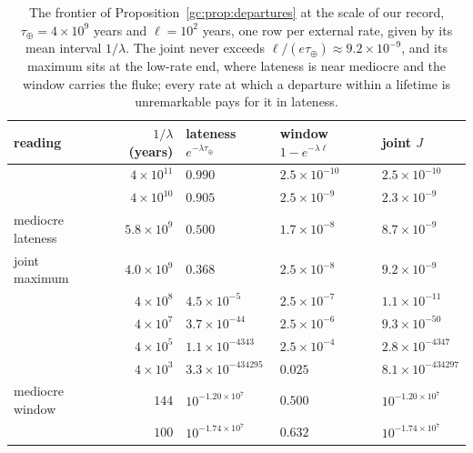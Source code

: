 \begin{table}[t]
\centering\small
\begin{tabular}{@{}lrlll@{}}
\toprule
reading & $1/\lambda$ (years) & lateness $e^{-\lambda\tau_\oplus}$ &
window $1-e^{-\lambda\ell}$ & joint $J$\\
\midrule
 & $4\times10^{11}$ & $0.990$ & $2.5\times10^{-10}$ & $2.5\times10^{-10}$\\
 & $4\times10^{10}$ & $0.905$ & $2.5\times10^{-9}$ & $2.3\times10^{-9}$\\
mediocre lateness & $5.8\times10^{9}$ & $0.500$ & $1.7\times10^{-8}$ & $8.7\times10^{-9}$\\
joint maximum & $4.0\times10^{9}$ & $0.368$ & $2.5\times10^{-8}$ & $9.2\times10^{-9}$\\
 & $4\times10^{8}$ & $4.5\times10^{-5}$ & $2.5\times10^{-7}$ & $1.1\times10^{-11}$\\
 & $4\times10^{7}$ & $3.7\times10^{-44}$ & $2.5\times10^{-6}$ & $9.3\times10^{-50}$\\
 & $4\times10^{5}$ & $1.1\times10^{-4343}$ & $2.5\times10^{-4}$ & $2.8\times10^{-4347}$\\
 & $4\times10^{3}$ & $3.3\times10^{-434295}$ & $0.025$ & $8.1\times10^{-434297}$\\
mediocre window & $144$ & $10^{-1.20\times10^{7}}$ & $0.500$ & $10^{-1.20\times10^{7}}$\\
 & $100$ & $10^{-1.74\times10^{7}}$ & $0.632$ & $10^{-1.74\times10^{7}}$\\
\bottomrule
\end{tabular}
\caption{The frontier of Proposition~\ref{gc:prop:departures} at the
scale of our record, $\tau_\oplus=4\times10^{9}$ years and
$\ell=10^{2}$ years, one row per external rate, given by its mean
interval $1/\lambda$. The joint never exceeds
$\ell/(e\tau_\oplus)\approx9.2\times10^{-9}$, and its maximum sits at the
low-rate end, where lateness is near mediocre and the window carries the
fluke; every rate at which a departure within a lifetime is unremarkable
pays for it in lateness.}
\label{tab:departures}
\end{table}

